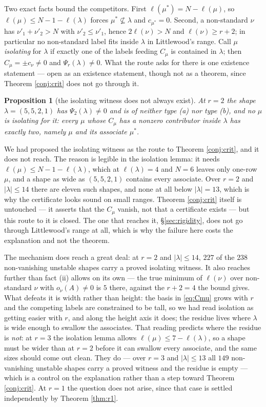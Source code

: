 \documentclass[11pt,reqno]{amsart}
\theoremstyle{plain}
\newtheorem{proposition}[theorem]{Proposition}
\theoremstyle{definition}
\begin{document}
Two exact facts bound the competitors. First $\ell(\mu^{*})=N-\ell(\mu)$, so $\ell(\mu)\le
N-1-\ell(\lambda)$ forces $\mu^{*}\not\subseteq\lambda$ and $c_{\mu^{*}}=0$. Second, a non-standard
$\nu$ has $\nu'_1+\nu'_2>N$ with $\nu'_2\le\nu'_1$, hence $2\ell(\nu)>N$ and $\ell(\nu)\ge r+2$; in
particular no non-standard label fits inside $\lambda$ in Littlewood's range. Call $\mu$
\emph{isolating} for $\lambda$ if exactly one of the labels feeding $C_\mu$ is contained in
$\lambda$; then $C_\mu=\pm c_\nu\ne0$ and $\Psi_r(\lambda)\ne0$. What the route asks for there is one
existence statement --- open as an existence statement, though not as a theorem, since Theorem
\ref{conj:crit} does not go through it.

\begin{proposition}[the isolating witness does not always exist]\label{conj:iso}
At $r=2$ the shape $\lambda=(5,5,2,1)$ has $\Psi_2(\lambda)\ne0$ and is of neither type {\rm(a)} nor
type {\rm(b)}, and no $\mu$ is isolating for it: every $\mu$ whose $C_\mu$ has a nonzero contributor
inside $\lambda$ has exactly two, namely $\mu$ and its associate $\mu^{*}$.
\end{proposition}

We had proposed the isolating witness as the route to Theorem \ref{conj:crit}, and it does not
reach. The reason is legible in the isolation lemma: it needs $\ell(\mu)\le N-1-\ell(\lambda)$, which
at $\ell(\lambda)=4$ and $N=6$ leaves only one-row $\mu$, and a shape as wide as $(5,5,2,1)$ contains
every associate. Over $r=2$ and $|\lambda|\le14$ there are eleven such shapes, and none at all below
$|\lambda|=13$, which is why the certificate looks sound on small ranges. Theorem \ref{conj:crit}
itself is untouched --- it asserts that the $C_\mu$ vanish, not that a certificate exists --- but
this route to it is closed. The one that reaches it, \S\ref{sec:rigidity}, does not go through
Littlewood's range at all, which is why the failure here costs the explanation and not the theorem.

The mechanism does reach a great deal: at $r=2$ and $|\lambda|\le14$, $227$ of the $238$ non-vanishing
unstable shapes carry a proved isolating witness. It also reaches further than fact (ii) allows on
its own --- the true minimum of $\ell(\nu)$ over non-standard $\nu$ with $o_\nu(A)\ne0$ is $5$ there,
against the $r+2=4$ the bound gives. What defeats it is width rather than height: the basis in
\eqref{eq:Cmu} grows with $r$ and the competing labels are constrained to be tall, so we had read
isolation as getting easier with $r$, and along the height axis it does; the residue lives where
$\lambda$ is wide enough to swallow the associates. That reading predicts where the residue is
\emph{not}: at $r=3$ the isolation lemma allows $\ell(\mu)\le7-\ell(\lambda)$, so a shape must be
wider than at $r=2$ before it can swallow every associate, and the same sizes should come out clean.
They do --- over $r=3$ and $|\lambda|\le13$ all $149$ non-vanishing unstable shapes carry a proved
witness and the residue is empty --- which is a control on the explanation rather than a step toward
Theorem \ref{conj:crit}. At $r=1$ the question does not arise, since that case is settled independently by
Theorem \ref{thm:r1}.
\end{document}
